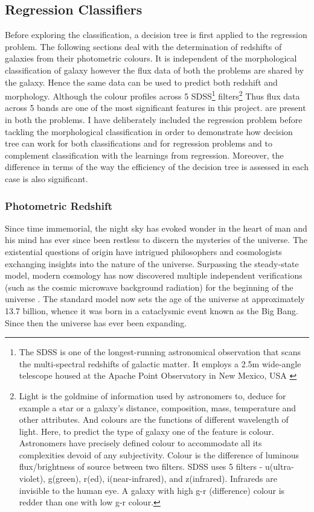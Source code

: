 \subsection{Regression Classifiers}
Before exploring the classification, a decision tree is first applied to the regression problem. The following sections deal with the determination of redshifts of galaxies from their photometric colours. It is independent of the morphological classification of galaxy however the flux data of both the problems are shared by the galaxy. Hence the same data can be used to predict both redshift and morphology. Although the colour profiles across 5 SDSS\footnote{The SDSS is one of the longest-running astronomical observation that scans the multi-spectral redshifts of galactic matter. It employs a 2.5m wide-angle telescope housed at the Apache Point Observatory in New Mexico, USA \parencite{sloan_digital_sky_survey_sloan_2014}} filters\footnote{Light is the goldmine of information used by astronomers to, deduce for example a star or a galaxy's distance, composition, mass, temperature and other attributes. And colours are the functions of different wavelength of light. Here, to predict the type of galaxy one of the feature is colour. Astronomers have precisely defined colour to accommodate all its complexities devoid of any subjectivity. Colour is the difference of luminous flux/brightness of source between two filters. SDSS uses 5 filters - u(ultra-violet), g(green), r(ed), i(near-infrared), and z(infrared). Infrareds are invisible to the human eye. A galaxy with high g-r (difference) colour is redder than one with low g-r colour.} Thus flux data across 5 bands are one of the most significant features in this project. are present in both the problems. I have deliberately included the regression problem before tackling the morphological classification in order to demonstrate how decision tree can work for both classifications and for regression problems and to complement classification with the learnings from regression. Moreover, the difference in terms of the way the efficiency of the decision tree is assessed in each case is also significant.

\subsubsection{Photometric Redshift}
Since time immemorial, the night sky has evoked wonder in the heart of man and his mind has ever since been restless to discern the mysteries of the universe. The existential questions of origin have intrigued philosophers and cosmologists exchanging insights into the nature of the universe. Surpassing the steady-state model, modern cosmology has now discovered multiple independent verifications (such as the cosmic microwave background radiation) for the beginning of the universe \parencite{ross_why_2008}.  The standard model now sets the age of the universe at approximately 13.7 billion, whence it was born in a cataclysmic event known as the Big Bang. Since then the universe has ever been expanding.


